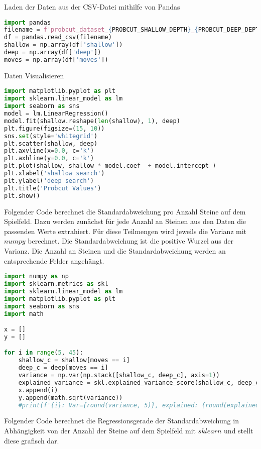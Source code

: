 Laden der Daten aus der CSV-Datei mithilfe von Pandas

\begin{lstlisting}[language=Python]
import pandas
filename = f'probcut_dataset_{PROBCUT_SHALLOW_DEPTH}_{PROBCUT_DEEP_DEPTH}.csv'
df = pandas.read_csv(filename)
shallow = np.array(df['shallow'])
deep = np.array(df['deep'])
moves = np.array(df['moves'])
\end{lstlisting}

Daten Visualisieren

\begin{lstlisting}[language=Python]
import matplotlib.pyplot as plt
import sklearn.linear_model as lm
import seaborn as sns
model = lm.LinearRegression()
model.fit(shallow.reshape(len(shallow), 1), deep)
plt.figure(figsize=(15, 10))
sns.set(style='whitegrid')
plt.scatter(shallow, deep)
plt.axvline(x=0.0, c='k')
plt.axhline(y=0.0, c='k')
plt.plot(shallow, shallow * model.coef_ + model.intercept_)
plt.xlabel('shallow search')
plt.ylabel('deep search')
plt.title('Probcut Values')
plt.show()
\end{lstlisting}

Folgender Code berechnet die Standardabweichung pro Anzahl Steine auf
dem Spielfeld. Dazu werden zunächst für jede Anzahl an Steinen aus den
Daten die passenden Werte extrahiert. Für diese Teilmengen wird jeweils
die Varianz mit \(numpy\) berechnet. Die Standardabweichung ist die
positive Wurzel aus der Varianz. Die Anzahl an Steinen und die
Standardabweichung werden an entsprechende Felder angehängt.

\begin{lstlisting}[language=Python]
import numpy as np
import sklearn.metrics as skl
import sklearn.linear_model as lm
import matplotlib.pyplot as plt
import seaborn as sns
import math

x = []
y = []

for i in range(5, 45):
    shallow_c = shallow[moves == i]
    deep_c = deep[moves == i]
    variance = np.var(np.stack([shallow_c, deep_c], axis=1))
    explained_variance = skl.explained_variance_score(shallow_c, deep_c)
    x.append(i)
    y.append(math.sqrt(variance))
    #print(f'{i}: Var={round(variance, 5)}, explained: {round(explained_variance, 3)}')
\end{lstlisting}

Folgender Code berechnet die Regressionsgerade der Standardabweichung in
Abhängigkeit von der Anzahl der Steine auf dem Spielfeld mit \(sklearn\)
und stellt diese grafisch dar.

